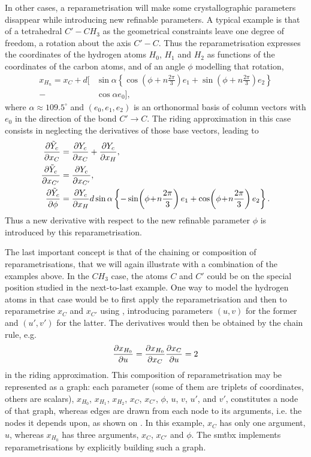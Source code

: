 \documentclass[pdf]{iucr}
\begin{document}
In other cases, a reparametrisation will make some crystallographic parameters disappear while introducing new refinable parameters. A typical example is that of a tetrahedral $C' - CH_3$ as the geometrical constraints leave one degree of freedom, a rotation about the axis $C' - C$. Thus the reparametrisation expresses the coordinates of the hydrogen atoms $H_0$, $H_1$ and $H_2$ as functions of the coordinates of the carbon atoms, and of an angle $\phi$ modelling that rotation,
\newcommand{\hydrogenphiarg}{\!\left(\phi\!+\!n \frac{2\pi}{3}\right)}
\begin{equation}
\begin{split}
x_{H_n} = x_C 
+ d \Biggl[ &\sin \alpha \left\{ \cos\hydrogenphiarg e_1 + \sin\hydrogenphiarg e_2 \right\}\\
- &\cos\alpha e_0
\Biggr],
\end{split}
\label{eqn:rotatingch3reparam}
\end{equation}
where $\alpha \approx 109.5^\circ$ and $(e_0, e_1, e_2)$ is an orthonormal basis of column vectors with $e_0$ in the direction of the bond $C' \rightarrow C$. The riding approximation in this case consists in neglecting the derivatives of those base vectors, leading to
\begin{align}
\partialder{\tilde{Y}_c}{x_C} &= \partialder{Y_c}{x_C} + \partialder{Y_c}{x_H},\\
\partialder{\tilde{Y}_c}{x_{C'}} &= \partialder{Y_c}{x_{C'}}, \nonumber \\
\partialder{\tilde{Y}_c}{\phi} &= \partialder{Y_c}{x_H} 
d \sin \alpha \left\{ -\sin\hydrogenphiarg e_1 + \cos\hydrogenphiarg e_2 \right\}. \nonumber
\end{align}
Thus a new derivative with respect to the new refinable parameter $\phi$ is introduced by this reparametrisation.

The last important concept is that of the chaining or composition of reparametrisations, that we will again illustrate with a combination of the examples above. In the $CH_3$ case, the atoms $C$ and $C'$ could be on the special position studied in the next-to-last example. One way to model the hydrogen atoms in that case would be to first apply the reparametrisation  and then to reparametrise $x_C$ and $x_{C'}$ using , introducing parameters $(u,v)$ for the former and $(u',v')$ for the latter. The derivatives would then be obtained by the chain rule, e.g.
\begin{equation}
\frac{\partial x_{H_0}}{\partial u} = \frac{\partial x_{H_0}}{\partial x_C}\frac{\partial x_C}{\partial u} = 2
\end{equation}
in the riding approximation. This composition of reparametrisation may be represented as a graph: each parameter (some of them are triplets of coordinates, others are scalars), $x_{H_0}$, $x_{H_1}$, $x_{H_2}$, $x_C$, $x_{C'}$, $\phi$, $u$, $v$, $u'$, and $v'$, constitutes a node of that graph, whereas edges are drawn from each node to its arguments, i.e. the nodes it depends upon, as shown on . In this example, $x_C$ has only one argument, $u$, whereas $x_{H_0}$ has three arguments, $x_C$, $x_{C'}$ and $\phi$. The smtbx implements reparametrisations by explicitly building such a graph.
\end{document}
